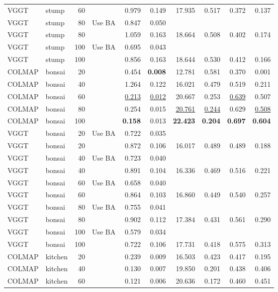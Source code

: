 \begin{table}[H]
\begin{tabular}{llrlrrrrrr}
VGGT & stump & 60 &  & 0.979 & 0.149 & 17.935 & 0.517 & 0.372 & 0.137 \\
VGGT & stump & 80 & Use BA & 0.847 & 0.050 &  &  &  &  \\
VGGT & stump & 80 &  & 1.059 & 0.163 & 18.664 & 0.508 & 0.402 & 0.174 \\
VGGT & stump & 100 & Use BA & 0.695 & 0.043 &  &  &  &  \\
VGGT & stump & 100 &  & 0.856 & 0.163 & 18.644 & 0.530 & 0.412 & 0.166 \\
\midrule
COLMAP & bonsai & 20 &  & 0.454 & \textbf{0.008} & 12.781 & 0.581 & 0.370 & 0.001 \\
COLMAP & bonsai & 40 &  & 1.264 & 0.122 & 16.021 & 0.479 & 0.519 & 0.211 \\
COLMAP & bonsai & 60 &  & \underline{0.213} & \underline{0.012} & 20.667 & 0.253 & \underline{0.639} & 0.507 \\
COLMAP & bonsai & 80 &  & 0.254 & 0.015 & \underline{20.761} & \underline{0.244} & 0.629 & \underline{0.508} \\
COLMAP & bonsai & 100 &  & \textbf{0.158} & 0.013 & \textbf{22.423} & \textbf{0.204} & \textbf{0.697} & \textbf{0.604} \\
VGGT & bonsai & 20 & Use BA & 0.722 & 0.035 &  &  &  &  \\
VGGT & bonsai & 20 &  & 0.872 & 0.106 & 16.017 & 0.489 & 0.489 & 0.188 \\
VGGT & bonsai & 40 & Use BA & 0.723 & 0.040 &  &  &  &  \\
VGGT & bonsai & 40 &  & 0.891 & 0.104 & 16.336 & 0.469 & 0.516 & 0.221 \\
VGGT & bonsai & 60 & Use BA & 0.658 & 0.040 &  &  &  &  \\
VGGT & bonsai & 60 &  & 0.864 & 0.103 & 16.860 & 0.449 & 0.540 & 0.257 \\
VGGT & bonsai & 80 & Use BA & 0.755 & 0.041 &  &  &  &  \\
VGGT & bonsai & 80 &  & 0.902 & 0.112 & 17.384 & 0.431 & 0.561 & 0.290 \\
VGGT & bonsai & 100 & Use BA & 0.579 & 0.034 &  &  &  &  \\
VGGT & bonsai & 100 &  & 0.722 & 0.106 & 17.731 & 0.418 & 0.575 & 0.313 \\
\midrule
COLMAP & kitchen & 20 &  & 0.239 & 0.009 & 16.503 & 0.423 & 0.417 & 0.195 \\
COLMAP & kitchen & 40 &  & 0.130 & 0.007 & 19.850 & 0.201 & 0.438 & 0.406 \\
COLMAP & kitchen & 60 &  & 0.121 & 0.006 & 20.636 & 0.172 & 0.460 & 0.451 \\

\end{tabular}
\end{table}

